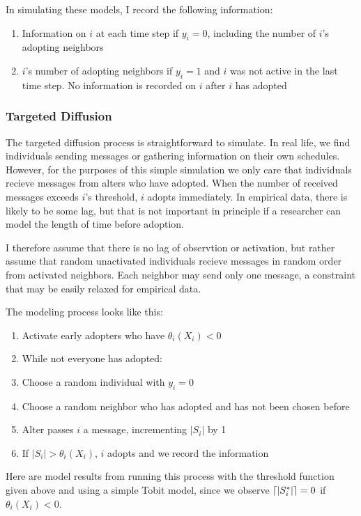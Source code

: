 \documentclass{article}
\DeclarePairedDelimiter{\ceil}{\lceil}{\rceil}
\begin{document}
In simulating these models, I record the following information: 
\begin{enumerate}
\item Information on $i$ at each time step if $y_i = 0$, including the number of $i$'s adopting neighbors
\item $i$'s number of adopting neighbors if $y_i = 1$ and $i$ was not active in the last time step. No information is recorded on $i$ after $i$ has adopted
\end{enumerate}

\subsubsection{Targeted Diffusion}

The targeted diffusion process is straightforward to simulate. In real life, we find individuals sending messages or gathering information on their own schedules. However, for the purposes of this simple simulation we only care that individuals recieve messages from alters who have adopted. When the number of received messages exceeds $i$'s threshold, $i$ adopts immediately. In empirical data, there is likely to be some lag, but that is not important in principle if a researcher can model the length of time before adoption.

I therefore assume that there is no lag of observtion or activation, but rather assume that random unactivated individuals recieve messages in random order from activated neighbors. Each neighbor may send only one message, a constraint that may be easily relaxed for empirical data.

The modeling process looks like this:
\begin{enumerate}
\item Activate early adopters who have $\theta_i(X_i) < 0$
\item While not everyone has adopted:
\item Choose a random individual with $y_i = 0$
\item Choose a random neighbor who has adopted and has not been chosen before
\item Alter passes $i$ a message, incrementing $|S_i|$ by 1
\item If $|S_i| > \theta_i(X_i)$, $i$ adopts and we record the information
\end{enumerate}

Here are model results from running this process with the threshold function given above and using a simple Tobit model, since we observe $\ceil{|S_i^*|} = 0$ if $\theta_i(X_i) < 0$. 
\end{document}
